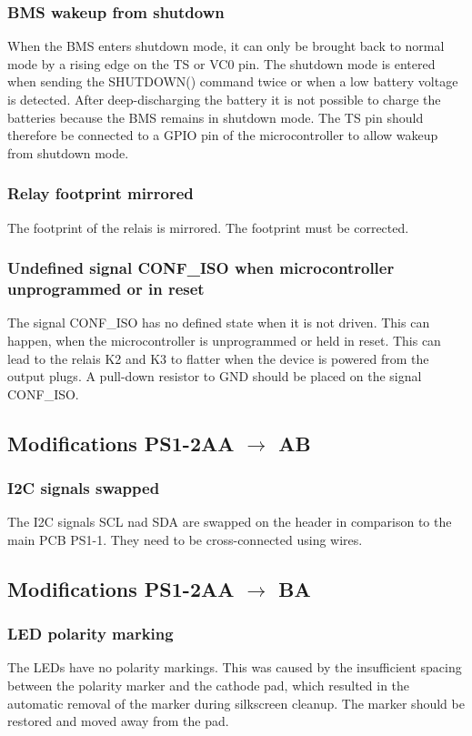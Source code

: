 \subsubsection{BMS wakeup from shutdown}
When the BMS enters shutdown mode, it can only be brought back to normal mode by a rising edge on the TS or VC0 pin. The shutdown mode is entered when sending the SHUTDOWN() command twice or when a low battery voltage is detected. After deep-discharging the battery it is not possible to charge the batteries because the BMS remains in shutdown mode. The TS pin should therefore be connected to a GPIO pin of the microcontroller to allow wakeup from shutdown mode. 

\subsubsection{Relay footprint mirrored}
The footprint of the relais is mirrored. The footprint must be corrected. 

\subsubsection{Undefined signal CONF\_ISO when microcontroller unprogrammed or in reset}
The signal CONF\_ISO has no defined state when it is not driven. This can happen, when the microcontroller is unprogrammed or held in reset. This can lead to the relais K2 and K3 to flatter when the device is powered from the output plugs. 
A pull-down resistor to GND should be placed on the signal CONF\_ISO. 

\subsection{Modifications PS1-2AA $\to$ AB}

\subsubsection{\acs{I2C} signals swapped}
The \ac{I2C} signals SCL nad SDA are swapped on the header in comparison to the main PCB PS1-1. They need to be cross-connected using wires. 

\subsection{Modifications PS1-2AA $\to$ BA}

\subsubsection{LED polarity marking}
The LEDs have no polarity markings. This was caused by the insufficient spacing between the polarity marker and the cathode pad, which resulted in the automatic removal of the marker during silkscreen cleanup. The marker should be restored and moved away from the pad. 

